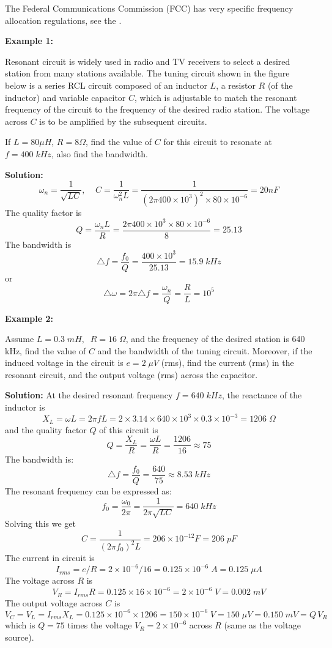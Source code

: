 The Federal Communications Commission (FCC) has very specific frequency allocation 
regulations, see the .



{\bf Example 1:}

Resonant circuit is widely used in radio and TV receivers to select a 
desired station from many stations available. The tuning circuit shown 
in the figure below is a series RCL circuit composed of an inductor 
$L$, a resistor $R$ (of the inductor) and variable capacitor $C$, which
is adjustable to match the resonant frequency of the circuit to the 
frequency of the desired radio station. The voltage across $C$ is to 
be amplified by the subsequent circuits.

If $L=80\mu H$, $R=8\Omega$, find the value of $C$ for this circuit to 
resonate at $f=400\;kHz$, also find the bandwidth.


{\bf Solution:}
\[
\omega_n=\frac{1}{\sqrt{LC}},\;\;\;\;
C=\frac{1}{\omega_n^2 L}=\frac{1}{(2\pi 400\times 10^3)^2\times 80\times 10^{-6}}
=20nF	\]
The quality factor is
\[
Q=\frac{\omega_n L}{R}=\frac{2\pi 400\times 10^3\times 80\times 10^{-6}}{8}=25.13
\]
The bandwidth is
\[ 
\triangle f=\frac{f_0}{Q}=\frac{400\times 10^3}{25.13}=15.9\;kHz
\]
or 
\[ 
\triangle \omega= 2\pi\triangle f=\frac{\omega_n}{Q}=\frac{R}{L}=10^5 
\]

{\bf Example 2:} 

Assume $L=0.3\; mH,\;\;R=16\;\Omega$, and the frequency of the desired 
station is 640 kHz, find the value of $C$ and the bandwidth of the tuning 
circuit. Moreover, if the induced voltage in the circuit is $e=2\;\mu V$
(rms), find the current (rms) in the resonant circuit, and the output 
voltage (rms) across the capacitor.

{\bf Solution:} At the desired resonant frequency $f=640\;kHz$, the 
reactance of the inductor is
\[
X_L=\omega L=2\pi f L
=2\times 3.14\times 640\times 10^3\times 0.3\times 10^{-3}=1206\;\Omega 
\]
and the quality factor $Q$ of this circuit is 
\[
Q=\frac{X_L}{R}=\frac{\omega L}{R}=\frac{1206}{16}\approx 75
\]
The bandwidth is:
\[
\triangle f =\frac{f_0}{Q}=\frac{640}{75}\approx 8.53\;kHz 
\]
The resonant frequency can be expressed as:
\[
f_0=\frac{\omega_0}{2\pi}=\frac{1}{2\pi\sqrt{LC}}=640\;kHz	
\]
Solving this we get
\[
C=\frac{1}{(2\pi f_0)^2L}=206\times 10^{-12}F=206\;pF	
\]
The current in circuit is
\[
I_{rms}=e/R=2\times 10^{-6}/16=0.125\times 10^{-6}\; A =0.125\;\mu A
\]
The voltage across $R$ is
\[
V_R=I_{rms} R=0.125\times 16\times 10^{-6}=2\times 10^{-6}\;V=0.002\;mV
\]
The output voltage across $C$ is
\[
V_C = V_L=I_{rms} X_L=0.125\times 10^{-6}\times 1206=150\times 10^{-6}\;V
=150\;\mu V =0.150\;mV=Q\,V_R
\]
which is $Q=75$ times the voltage $V_R=2\times 10^{-6}$ across $R$ 
(same as the voltage source).


